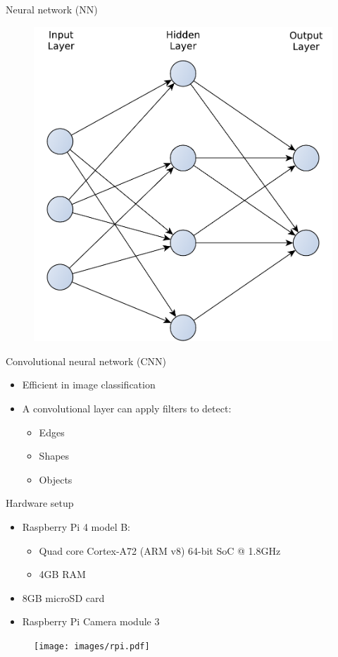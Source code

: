 \begin{frame}{Neural network (NN)}
  \begin{figure}
	\includegraphics[width=\linewidth,height=0.75\textheight,keepaspectratio]{images/neural_network.pdf}
  \end{figure}
\end{frame}

\begin{frame}{Convolutional neural network (CNN)}
  \begin{itemize}
	\item Efficient in image classification
	\item A convolutional layer can apply filters to detect:
	  \begin{itemize}
		\item Edges
		\item Shapes
		\item Objects
	  \end{itemize}
  \end{itemize}
\end{frame}

\begin{frame}{Hardware setup}
  \begin{itemize}
	\item Raspberry Pi 4 model B:
	  \begin{itemize}
		\item Quad core Cortex-A72 (ARM v8) 64-bit SoC @ 1.8GHz
		\item 4GB RAM
	  \end{itemize}
	\item 8GB microSD card
	\item Raspberry Pi Camera module 3
  \end{itemize}
  \begin{figure}
	\texttt{[image: images/rpi.pdf]}
  \end{figure}
\end{frame}

